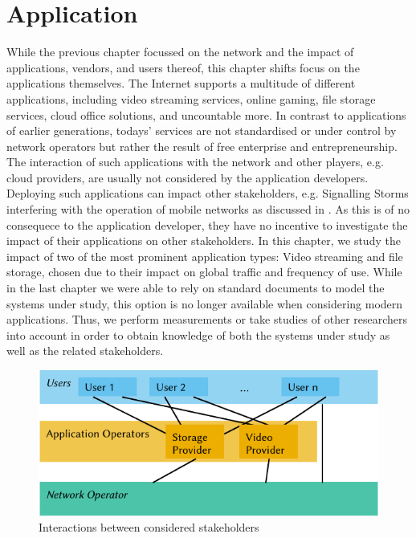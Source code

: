 \chapter{Application}\label{chap:application}

\newcommand{\download}{Download\xspace}
\newcommand{\live}{Live\xspace}
\newcommand{\serviceprovisioning}{Provisioning\xspace}
\newcommand{\streaming}{Streaming\xspace}

While the previous chapter focussed on the network and the impact of applications, vendors, and users thereof, this chapter shifts focus on the applications themselves.
The Internet supports a multitude of different applications, including video streaming services, online gaming, file storage services, cloud office solutions, and uncountable more.
In contrast to applications of earlier generations, todays' services are not standardised or under control by network operators but rather the result of free enterprise and entrepreneurship.
The interaction of such applications with the network and other players, e.g. cloud providers, are usually not considered by the application developers.
Deploying such applications can impact other stakeholders, e.g. Signalling Storms interfering with the operation of mobile networks as discussed in .
As this is of no consequece to the application developer, they have no incentive to investigate the impact of their applications on other stakeholders.
In this chapter, we study the impact of two of the most prominent application types: Video streaming and file storage, chosen due to their impact on global traffic and frequency of use.
While in the last chapter we were able to rely on standard documents to model the systems under study, this option is no longer available when considering modern applications.
Thus, we perform measurements or take studies of other researchers into account in order to obtain knowledge of both the systems under study as well as the related stakeholders.

\begin{figure}
  \centering
  \includegraphics{application/figures/stakeholders}
  \caption{Interactions between considered stakeholders}
  \label{fig:application:stakeholders}
\end{figure}

